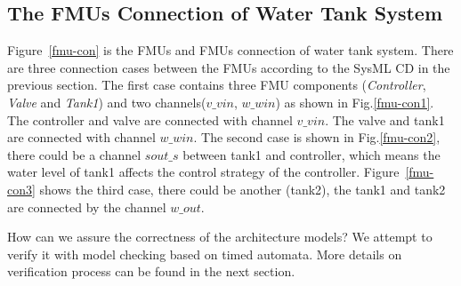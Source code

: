 \subsection{The FMUs  Connection of Water Tank System}
Figure~\ref{fmu-con} is the FMUs and FMUs connection of water tank system. There are three connection cases between the FMUs according to the SysML CD in the previous section. The first case contains three FMU components (\emph{Controller}, \emph{Valve} and \emph{ Tank1}) and two channels($v \_ vin$, $w \_ win$) as shown in Fig.\ref{fmu-con1}. The controller and valve are connected with channel $v \_ vin$. The valve and tank1 are connected with channel $w \_ win$. The second case is shown in Fig.\ref{fmu-con2}, there could be a channel $sout \_ s$ between tank1 and controller, which means the water level of tank1 affects the control strategy of the controller. Figure~\ref{fmu-con3} shows the third case, there could be another (tank2), the tank1 and tank2 are connected by the channel $w \_ out$. 
\begin{figure}[htbp]
\end{figure}
How can we assure the correctness of the architecture models? We attempt to verify it with model checking based on timed automata. More details on verification process can be found in the next section.